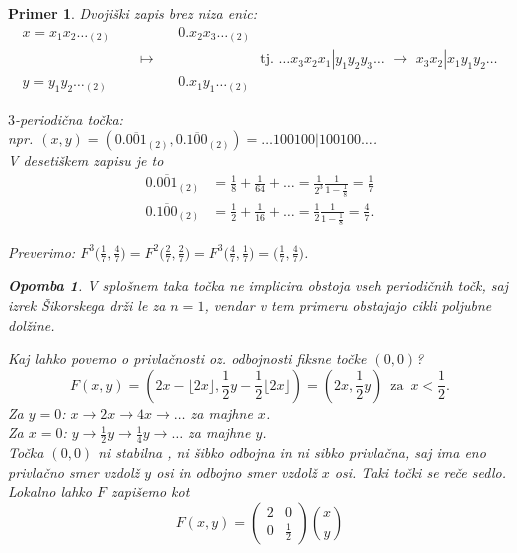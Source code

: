 \documentclass{article}
\newtheorem{opomba}{Opomba}
\newtheorem{primer}{Primer}
\begin{document}
\begin{primer}
Dvojiški zapis brez niza enic:
\begin{align*}
x = x_1 x_2 \dots_{(2)} \quad&\quad\quad\quad 0.x_2 x_3 \dots_{(2)} \\[-2mm]
&\longmapsto \quad\quad\quad\quad\quad\quad\quad \text{ tj. } \dots x_3x_2x_1 | y_1 y_2 y_3 \dots \,\,\longrightarrow\,\, x_3 x_2| x_1 y_1 y_2\dots \\[-2mm]
y = y_1 y_2 \dots_{(2)} \quad&\quad\quad\quad 0.x_1 y_1 \dots_{(2)}
\end{align*}

\noindent
$3$-periodična točka:\\[1mm]
npr. $(x, y) = (0. \overline{001}_{(2)}, 0. \overline{100}_{(2)}) = \dots 100100|100100 \dots$.\\
V desetiškem zapisu je to 
\begin{align*}
0.\overline{001}_{(2)} &= \frac{1}{8} + \frac{1}{64} + \dots = \frac{1}{2^3} \frac{1}{1 - \frac{1}{8}} = \frac{1}{7} \\
0.\overline{100}_{(2)} &= \frac{1}{2} + \frac{1}{16} + \dots = \frac{1}{2} \frac{1}{1 - \frac{1}{8}} = \frac{4}{7}.
\end{align*}

Preverimo: $F^3\Big(\frac{1}{7}, \frac{4}{7}\Big) = F^2\Big(\frac{2}{7}, \frac{2}{7}\Big) = F^3\Big(\frac{4}{7}, \frac{1}{7}\Big) = \Big(\frac{1}{7}, \frac{4}{7}\Big)$.

\begin{opomba}
    V splošnem taka točka ne implicira obstoja vseh periodičnih točk, saj 
    izrek Šikorskega drži le za $n=1$, vendar v tem primeru obstajajo cikli 
    poljubne dolžine.
\end{opomba}
   
Kaj lahko povemo o privlačnosti oz. odbojnosti fiksne točke $(0, 0)$?
$$
F(x, y) = (2x - \lfloor 2x \rfloor, \frac{1}{2}y - \frac{1}{2}\lfloor 2x \rfloor) = (2x, \frac{1}{2} y) \,\text{ za }\, x < \frac{1}{2}.
$$
Za $y=0$: $x \rightarrow 2x \rightarrow 4x \rightarrow \dots$ za majhne $x$.\\
Za $x=0$: $y \rightarrow \frac{1}{2} y \rightarrow \frac{1}{4} y \rightarrow \dots$ za majhne $y$.\\[1mm]
Točka $(0, 0)$ ni stabilna , ni šibko odbojna in ni sibko privlačna, saj ima eno 
privlačno smer vzdolž $y$ osi in odbojno smer vzdolž $x$ osi. Taki 
točki se reče sedlo.\\
\noindent
Lokalno lahko $F$ zapišemo kot 
$$ F(x, y)=\left(\begin{array}{ll}
    2 & 0 \\
    0 & \frac{1}{2}
    \end{array}\right)\binom{x}{y}$$
\end{primer}
\end{document}
